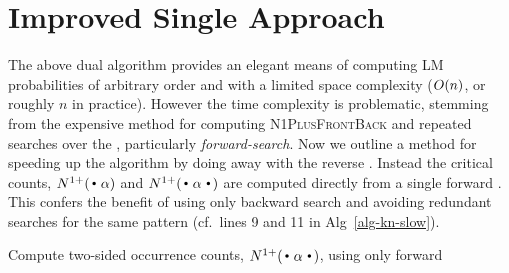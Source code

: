 \section{Improved Single \CST Approach}

The above dual \CST algorithm provides an elegant means of computing LM probabilities of arbitrary order and with a limited space complexity ($O(n)$, or roughly $n$ in practice).
However the time complexity is problematic, stemming from the expensive method for computing \textsc{N1PlusFrontBack} and repeated searches over the \CST, particularly \emph{forward-search}.
Now we outline a method for speeding up the algorithm by doing away with the reverse \CST.
Instead the critical counts, $\nlplus{\dotpat}$ and $\nlplus{\dotpatdot}$ are computed directly from a single forward \CST. 
This confers the benefit of using only backward search and avoiding redundant searches for the same pattern (cf.~lines 9 and 11 in Alg~\ref{alg-kn-slow}).

\begin{algorithm}[htpb]
  \caption{Compute two-sided occurrence counts, $\nlplus{\dotpatdot}$, using only forward \CST 
    \label{alg:n1plusfb_wt}}
\footnotesize
  \begin{algorithmic}[1]
        \If{$\depth{\tf}{\nf} > |\alpha|$}   
        \Else
            \EndFor
          \EndIf
      \State {}
    \EndFunction
  \end{algorithmic}
\end{algorithm}

